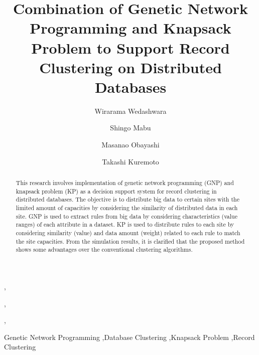 \documentclass{elsart}
\begin{document}
\begin{frontmatter}



\title{Combination of Genetic Network Programming and Knapsack Problem to Support Record Clustering on Distributed Databases}


\author[label1]{Wirarama Wedashwara},
\author[label1]{Shingo Mabu},
\author[label1]{Masanao Obayashi},
\author[label1]{Takashi Kuremoto}

\address[label1]{Graduate School of Science and Engineering, Yamaguchi University, Tokiwadai 2-16-1, Ube, Yamaguchi, 755-8611,  Japan}

\begin{abstract}
This research involves implementation of genetic network programming (GNP) and knapsack problem (KP) as a decision support system for record clustering in distributed databases. The objective is to distribute big data to certain sites with the limited amount of capacities by considering the similarity of distributed data in each site. GNP is used to extract rules from big data by considering characteristics (value ranges) of each attribute in a dataset. KP is used to distribute rules to each site by considering similarity (value) and data amount (weight) related to each rule to match the site capacities. From the simulation results, it is clarified that the proposed method shows some advantages over the conventional clustering algorithms. 
\end{abstract}


\begin{keyword}
Genetic Network Programming
\sep Database Clustering
\sep Knapsack Problem
\sep Record Clustering
\end{keyword}
\end{frontmatter}
\end{document}
